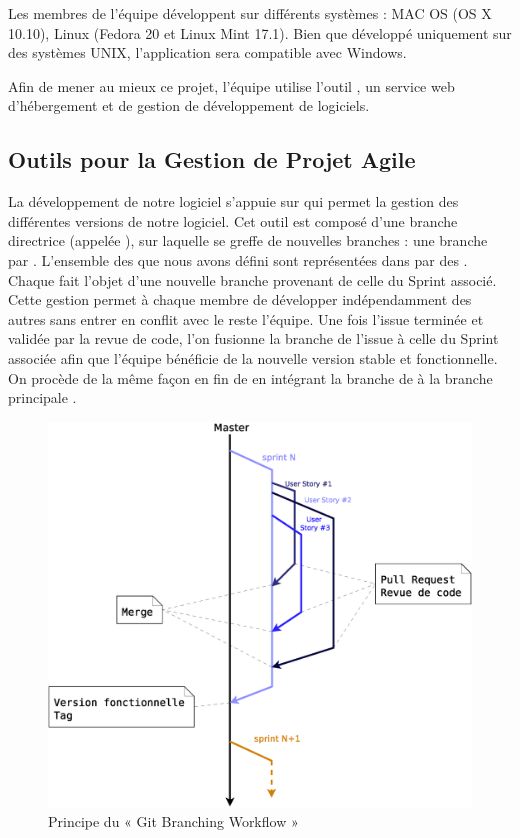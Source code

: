 Les membres de l’équipe développent sur différents systèmes : MAC OS (OS X 10.10), Linux (Fedora 20 et Linux Mint 17.1). Bien que développé uniquement sur des systèmes UNIX, l’application sera compatible avec Windows. 

Afin de mener au mieux ce projet, l'équipe utilise l'outil , un service web d’hébergement et de gestion de développement de logiciels. 

\subsection{Outils pour la Gestion de Projet Agile}
La développement de notre logiciel s’appuie sur  qui permet la gestion des différentes versions de notre logiciel. 
Cet outil est composé d’une branche directrice (appelée ), sur laquelle se greffe de nouvelles branches : une branche par . L’ensemble des  que nous avons défini sont représentées dans  par des . Chaque  fait l’objet d’une nouvelle branche provenant de celle du Sprint associé. Cette gestion permet à chaque membre de développer indépendamment des autres sans entrer en conflit avec le reste l’équipe. Une fois l’issue terminée et validée par la revue de code, l’on fusionne la branche de l’issue à celle du Sprint associée afin que l’équipe bénéficie de la nouvelle version stable et fonctionnelle. On procède de la même façon en fin de  en intégrant la branche de  à la branche principale .

\begin{figure}[H]
	\centering
	\includegraphics*[width=12cm]{screens/BranchingWorkflow.eps}
	\caption{Principe du « Git Branching Workflow »}
\end{figure}

